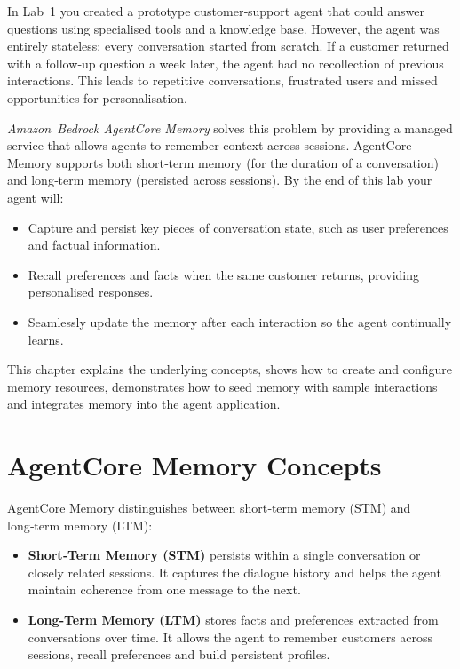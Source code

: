 In Lab 1 you created a prototype customer‑support agent that could answer
questions using specialised tools and a knowledge base.  However, the agent
was entirely stateless: every conversation started from scratch.  If a
customer returned with a follow‑up question a week later, the agent had no
recollection of previous interactions.  This leads to repetitive
conversations, frustrated users and missed opportunities for personalisation.

\emph{Amazon Bedrock AgentCore Memory} solves this problem by providing a
managed service that allows agents to remember context across sessions.
AgentCore Memory supports both short‑term memory (for the duration of a
conversation) and long‑term memory (persisted across sessions).  By the end
of this lab your agent will:

\begin{itemize}
  \item Capture and persist key pieces of conversation state, such as user
        preferences and factual information.
  \item Recall preferences and facts when the same customer returns,
        providing personalised responses.
  \item Seamlessly update the memory after each interaction so the agent
        continually learns.
\end{itemize}

This chapter explains the underlying concepts, shows how to create and
configure memory resources, demonstrates how to seed memory with sample
interactions and integrates memory into the agent application.

\section{AgentCore Memory Concepts}

AgentCore Memory distinguishes between short‑term memory (STM) and
long‑term memory (LTM):

\begin{itemize}
  \item \textbf{Short‑Term Memory (STM)} persists within a single
        conversation or closely related sessions.  It captures the dialogue
        history and helps the agent maintain coherence from one message to
        the next.
  \item \textbf{Long‑Term Memory (LTM)} stores facts and preferences
        extracted from conversations over time.  It allows the agent to
        remember customers across sessions, recall preferences and build
        persistent profiles.
\end{itemize}


